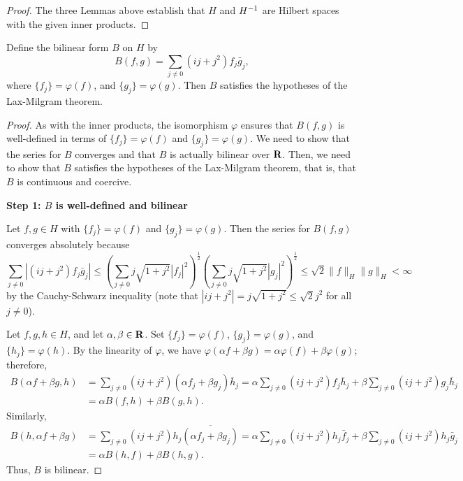 \documentclass{homework}
\begin{document}
\begin{arabicparts}
\begin{proof}
		The three Lemmas above establish that $H$ and ${H^{-1}}$ are Hilbert spaces with the given inner products.
		\end{proof}
		
		\questionpart
		Define the bilinear form $B$ on $H$ by
		\begin{equation}
			B(f,g) = \sum_{j\ne0}(ij + j^2)f_j\bar{g}_j,
		\end{equation}
		where $\{f_j\} = \varphi(f)$, and $\{g_j\} = \varphi(g)$.
		Then $B$ satisfies the hypotheses of the Lax-Milgram theorem.
		
		\begin{proof}
			As with the inner products, the isomorphism $\varphi$ ensures that $B(f,g)$ is well-defined in terms of $\{f_j\} = \varphi(f)$ and $\{g_j\} = \varphi(g)$. We need to show that the series for $B$ converges and that $B$ is actually bilinear over $\textnormal{\bf R}$. Then, we need to show that $B$ satisfies the hypotheses of the Lax-Milgram theorem, that is, that $B$ is continuous and coercive.
			
			\textbf{Step 1: $B$ is well-defined and bilinear}
			
			Let $f, g\in H$ with $\{f_j\} = \varphi(f)$ and $\{g_j\} = \varphi(g)$. Then the series for $B(f,g)$ converges absolutely because
			\begin{equation}
				\label{eq:B_bounded}
				\sum_{j\ne0}|(ij+j^2)f_j\bar{g}_j| \le \left(\sum_{j\ne0}j\sqrt{1+j^2}|f_j|^2\right)^\frac{1}{2}\left(\sum_{j\ne0}j\sqrt{1+j^2}|g_j|^2\right)^\frac{1}{2} \le \sqrt{2}\lVert f \rVert_H\lVert g\rVert_H < \infty
			\end{equation}
			by the Cauchy-Schwarz inequality (note that $|ij +j^2| = j\sqrt{1+j^2} \le \sqrt{2}j^2$ for all $j\ne 0$).
			
			Let $f,g,h\in H$, and let $\alpha,\beta \in \textnormal{\bf R}$. Set $\{f_j\} = \varphi(f)$, $\{g_j\} = \varphi(g)$, and $\{h_j\} = \varphi(h)$. By the linearity of $\varphi$, we have $\varphi(\alpha f + \beta g) = \alpha \varphi(f)+ \beta\varphi(g)$; therefore,
			\begin{align}
				B(\alpha f + \beta g, h) &= \sum_{j\ne0}(ij + j^2)(\alpha f_j + \beta g_j)\bar{h}_j =\alpha\sum_{j\ne 0}(ij+j^2)f_j\bar{h}_j + \beta\sum_{j\ne0}(ij+j^2)g_j\bar{h}_j \\
				&= \alpha B(f,h) + \beta B(g,h).
			\end{align}
			Similarly,
			\begin{align}
				B(h, \alpha f + \beta g) &= \sum_{j\ne0}(ij + j^2)h_j\overline{(\alpha f_j + \beta g_j)} =\alpha\sum_{j\ne 0}(ij+j^2)h_j\bar{f}_j + \beta\sum_{j\ne0}(ij+j^2)h_j\bar{g}_j \\
				&= \alpha B(h,f) + \beta B(h,g).
			\end{align}
			Thus, $B$ is bilinear.
			

\end{proof}
\end{arabicparts}
\end{document}
